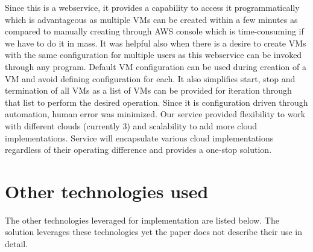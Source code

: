 Since this is a webservice, it provides a capability to access it
programmatically which is advantageous as multiple VMs can be created within a
few minutes as compared to manually creating through AWS console which is
time-consuming if we have to do it in mass. It was helpful also when there is a
desire to create VMs with the same configuration for multiple users as this
webservice can be invoked through any program. Default VM configuration can be
used during creation of a VM and avoid defining configuration for each. It also
simplifies start, stop and termination of all VMs as a list of VMs can be
provided for iteration through that list to perform the desired operation. 
Since it is configuration driven through automation, human error was minimized.
Our service provided flexibility to work with different clouds (currently 3)
and
scalability to add more cloud implementations. Service will encapsulate various
cloud implementations regardless of their operating difference and provides a
one-stop solution.



\section{Other technologies used}
The other technologies leveraged for implementation are listed below. The
solution leverages these technologies yet the paper does not describe their
use in detail.

